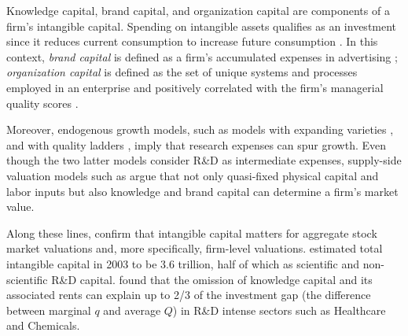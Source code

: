 \documentclass[12pt, letterpaper]{article}
\begin{document}
Knowledge capital, brand capital, and organization capital are components of a firm's intangible capital. Spending on intangible assets qualifies as an investment since it reduces current consumption to increase future consumption \citep{Corrado2009-kd, Corrado2009-hk}. In this context, \emph{brand capital} is defined as a firm's accumulated expenses in advertising \citep{Belo2019-iz}; \emph{organization capital} is defined as the set of unique systems and processes employed in an enterprise and positively correlated with the firm's managerial quality scores \citep{Eisfeldt2013-ad, Bloom2007-gl}. 

  Moreover, endogenous growth models, such as models with expanding varieties \citep{Romer1990-tw}, and with quality ladders \citep{Grossman1991-pz, Atkeson2019-wz}, imply that research expenses can spur growth. Even though the two latter models consider R\&D as intermediate expenses, supply-side valuation models such as \cite{Belo2013-ys} argue that not only quasi-fixed physical capital and labor inputs but also knowledge and brand capital can determine a firm's market value. 

Along these lines, \cite{Hall2001-ni, McGrattan2001-kc, Vitorino2014-yd, Eisfeldt2020-ec, Li2014-zp} confirm that intangible capital matters for aggregate stock market valuations and, more specifically, firm-level valuations. \cite{Corrado2009-kd} estimated total intangible capital in 2003 to be 3.6 trillion, half of which as scientific and non-scientific R\&D capital. \cite{Crouzet2022-ic} found that the omission of knowledge capital and its associated rents can explain up to 2/3 of the investment gap (the difference between marginal $q$ and average $Q$) in R\&D intense sectors such as Healthcare and Chemicals.
\end{document}
